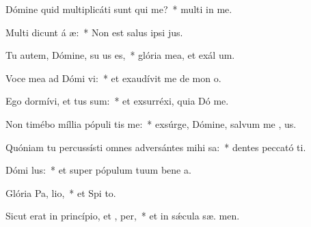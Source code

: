 \item Dómine quid multiplicáti sunt qui  me?~* multi in  me.
\item Multi dicunt á æ:~* Non est salus ipsi   jus.
\item Tu autem, Dómine, su us es,~* glória mea, et exál  um.
\item Voce mea ad Dómi vi:~* et exaudívit me de mon  o.
\item Ego dormívi, et tus sum:~* et exsurréxi, quia Dó  me.
\item Non timébo míllia pópuli tis me:~* exsúrge, Dómine, salvum me ,  us.
\item Quóniam tu percussísti omnes adversántes mihi  sa:~* dentes peccató ti.
\item Dómi  lus:~* et super pópulum tuum bene a.
\item Glória Pa,  lio,~* et Spi to.
\item Sicut erat in princípio, et ,  per,~* et in sǽcula sæ. men.
